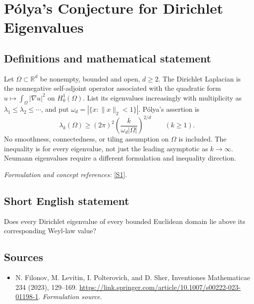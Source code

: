 \documentclass[11pt]{article}
\begin{document}
\section*{\texorpdfstring{Pólya's Conjecture for Dirichlet Eigenvalues}{Pólya's Conjecture for Dirichlet Eigenvalues}}\label{402}
\subsection{Definitions and mathematical statement}
Let $\Omega\subset{\mathbb{R}}^d$ be nonempty, bounded and open, $d\ge2$. The Dirichlet Laplacian is the nonnegative self-adjoint operator associated with the quadratic form $u\mapsto\int_\Omega|\nabla u|^2$ on $H_0^1(\Omega)$. List its eigenvalues increasingly with multiplicity as $\lambda_1\le\lambda_2\le\cdots$, and put $\omega_d=|\{x:\|x\|_2<1\}|$. P\'olya's assertion is
\[
 \lambda_k(\Omega)\ge(2\pi)^2
 \left(\frac{k}{\omega_d|\Omega|}\right)^{2/d}
 \qquad(k\ge1).
\]
No smoothness, connectedness, or tiling assumption on $\Omega$ is included. The inequality is for every eigenvalue, not just the leading asymptotic as $k\to\infty$. Neumann eigenvalues require a different formulation and inequality direction.
\par\smallskip\textit{Formulation and concept references:} \href{https://link.springer.com/article/10.1007/s00222-023-01198-1}{[S1]}.

\subsection{Short English statement}
Does every Dirichlet eigenvalue of every bounded Euclidean domain lie above its corresponding Weyl-law value?
\subsection{Sources}
\begin{itemize}
\item[S1]N. Filonov, M. Levitin, I. Polterovich, and D. Sher, Inventiones Mathematicae 234 (2023), 129–169.
\url{https://link.springer.com/article/10.1007/s00222-023-01198-1}.
\textit{Formulation source.}
\end{itemize}
\end{document}

